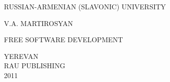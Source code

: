 
\thispagestyle{empty}
{\large
\begin{center}
RUSSIAN-ARMENIAN (SLAVONIC) UNIVERSITY
\end{center}


\vskip 180pt

\begin{center}

V.A. MARTIROSYAN

\vskip 50pt

FREE SOFTWARE DEVELOPMENT
\end{center}

\vskip 260pt
\begin{center}
YEREVAN \\
RAU PUBLISHING\\
2011
\end{center}
}
